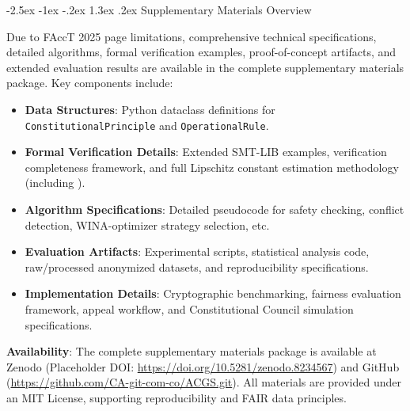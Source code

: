 \documentclass[manuscript,screen,9pt]{acmart}
\makeatletter
\renewcommand\section{\@startsection{section}{1}{\z@}%
  {-2.5ex \@plus -1ex \@minus -.2ex}%
  {1.3ex \@plus.2ex}%
  {\normalfont\Large\bfseries}}
\makeatother
\begin{document}




\appendix

\section{Supplementary Materials Overview} 
\label{app:supplementary}

Due to FAccT 2025 page limitations, comprehensive technical specifications, detailed algorithms, formal verification examples, proof-of-concept artifacts, and extended evaluation results are available in the complete supplementary materials package. Key components include:
\begin{itemize}[leftmargin=*,itemsep=1pt,parsep=1pt]
    \item \textbf{Data Structures}: Python dataclass definitions for \texttt{ConstitutionalPrinciple} and \texttt{OperationalRule}.
    \item \textbf{Formal Verification Details}: Extended SMT-LIB examples, verification completeness framework, and full Lipschitz constant estimation methodology (including ).
    \item \textbf{Algorithm Specifications}: Detailed pseudocode for safety checking, conflict detection, WINA-optimizer strategy selection, etc.
    \item \textbf{Evaluation Artifacts}: Experimental scripts, statistical analysis code, raw/processed anonymized datasets, and reproducibility specifications.
    \item \textbf{Implementation Details}: Cryptographic benchmarking, fairness evaluation framework, appeal workflow, and Constitutional Council simulation specifications.
\end{itemize}
\textbf{Availability}: The complete supplementary materials package is available at Zenodo (Placeholder DOI: \url{https://doi.org/10.5281/zenodo.8234567}) and GitHub (\url{https://github.com/CA-git-com-co/ACGS.git}). All materials are provided under an MIT License, supporting reproducibility and FAIR data principles.
\end{document}
